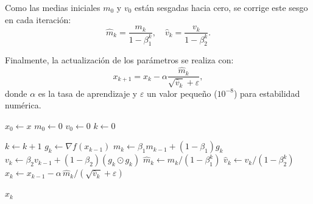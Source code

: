 Como las medias iniciales $m_0$ y $v_0$ están sesgadas hacia cero, se corrige este sesgo en cada iteración:  
\[
\hat{m}_k = \frac{m_k}{1-\beta_1^k}, \quad
\hat{v}_k = \frac{v_k}{1-\beta_2^k}.
\]

Finalmente, la actualización de los parámetros se realiza con:  
\[
x_{k+1} = x_k - \alpha \frac{\hat{m}_k}{\sqrt{\hat{v}_k} + \varepsilon},
\]  
donde $\alpha$ es la tasa de aprendizaje y $\varepsilon$ un valor pequeño ($10^{-8}$) para estabilidad numérica.

\begin{algorithm}[H]
\caption{ADAM: Adaptive Moment Estimation}
\label{alg:adam_latex}
\begin{algorithmic}[1]
\State $x_0 \gets x$ 
\State $m_0 \gets 0$
\State $v_0 \gets 0$
\State $k \gets 0$

    \State $k \gets k + 1$
    \State $g_k \gets \nabla f(x_{k-1})$ 
    \State $m_k \gets \beta_1 m_{k-1} + (1-\beta_1) g_k$
    \State $v_k \gets \beta_2 v_{k-1} + (1-\beta_2) (g_k \odot g_k)$
    \State $\hat{m}_k \gets m_k / (1 - \beta_1^k)$
    \State $\hat{v}_k \gets v_k / (1 - \beta_2^k)$
    \State $x_k \gets x_{k-1} - \alpha \, \hat{m}_k / (\sqrt{\hat{v}_k} + \varepsilon)$
\EndWhile

\State \Return $x_k$
\end{algorithmic}
\end{algorithm}